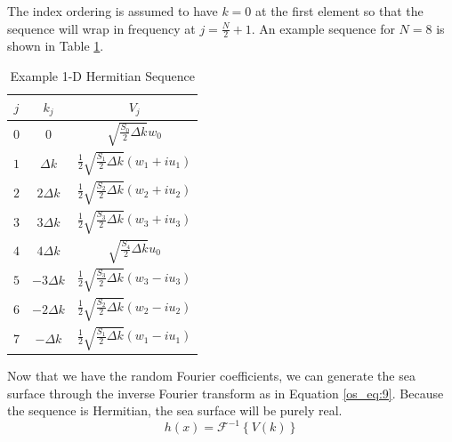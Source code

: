 The index ordering is assumed to have $k=0$ at the first element so that the sequence will wrap in frequency at $j = \frac{N}{2} + 1$. An example sequence for $N = 8$ is shown in Table \ref{os_tab:2a}.
\begin{table}[H]
  \begin{center}
      \renewcommand{\baselinestretch}{1} \small\normalsize
  \begin{quote}
    \caption[Example 1-D Hermitian Sequence]{Example 1-D Hermitian Sequence\label{os_tab:2a}}
  \end{quote}
  \begin{tabular} {| c | c | c |}
    \hline
  \bf{$j$} & \bf{$k_j$} & \bf{$V_j$} \\ \hline
  $0$ & $0$ & $\sqrt{\frac{S_{0}}{2} \Delta k}w_0$ \\ \hline
  $1$ & $\Delta k$ & $\frac{1}{2}\sqrt{\frac{S_{1}}{2} \Delta k} \left(w_1 + iu_1 \right)$ \\ \hline
  $2$ & $2\Delta k$ & $\frac{1}{2}\sqrt{\frac{S_{2}}{2} \Delta k} \left(w_2 + iu_2 \right)$ \\ \hline
  $3$ & $3\Delta k$ & $\frac{1}{2}\sqrt{\frac{S_{3}}{2} \Delta k} \left(w_3 + iu_3 \right)$ \\ \hline
  $4$ & $4\Delta k$ & $\sqrt{\frac{S_{4}}{2} \Delta k} u_0$ \\ \hline
  $5$ & $-3\Delta k$ & $\frac{1}{2}\sqrt{\frac{S_{3}}{2} \Delta k} \left(w_3 - iu_3 \right)$ \\ \hline
  $6$ & $-2\Delta k$ & $\frac{1}{2}\sqrt{\frac{S_{2}}{2} \Delta k} \left(w_2 - iu_2 \right)$  \\ \hline
  $7$ & $-\Delta k$ & $\frac{1}{2}\sqrt{\frac{S_{1}}{2} \Delta k} \left(w_1 - iu_1 \right)$ \\ \hline

\end{tabular}
\end{center}
\end{table}
\renewcommand{\baselinestretch}{2} \small\normalsize

Now that we have the random Fourier coefficients, we can generate the sea surface through the inverse Fourier transform as in Equation \ref{os_eq:9}. Because the sequence is Hermitian, the sea surface will be purely real.
\begin{equation}
  \label{os_eq:9}
  h(x) = \mathcal{F}^{-1}\left\{V(k) \right\}
  \end{equation}

